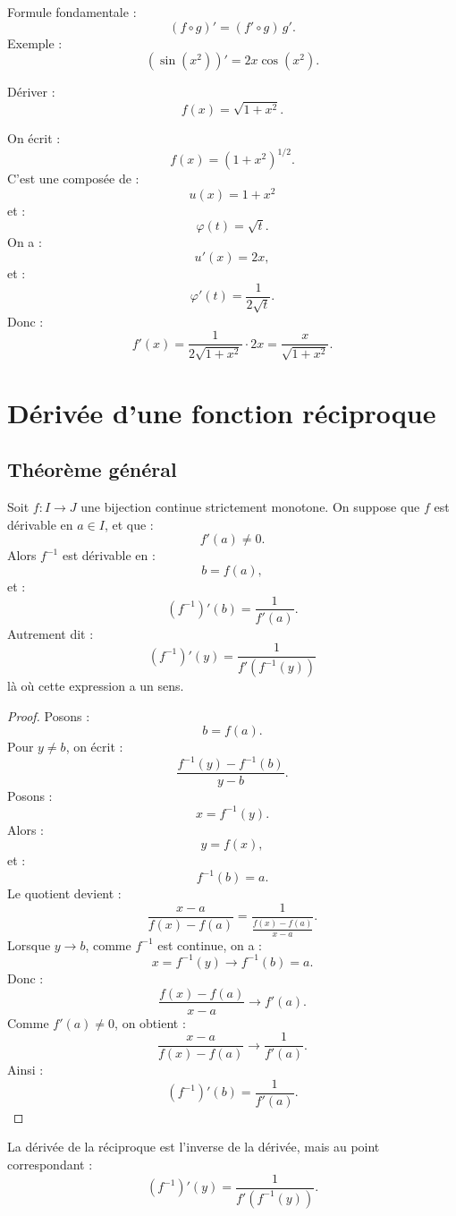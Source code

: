 \documentclass[11pt,a4paper]{article}
\begin{document}
\begin{retenirbox}
Formule fondamentale :
\[
(f\circ g)'=(f'\circ g)\,g'.
\]
Exemple :
\[
(\sin(x^2))'=2x\cos(x^2).
\]
\end{retenirbox}

\begin{exercicebox}[Composition]
Dériver :
\[
f(x)=\sqrt{1+x^2}.
\]
\end{exercicebox}

\begin{correctionbox}
On écrit :
\[
f(x)=(1+x^2)^{1/2}.
\]
C'est une composée de :
\[
u(x)=1+x^2
\]
et :
\[
\varphi(t)=\sqrt t.
\]
On a :
\[
u'(x)=2x,
\]
et :
\[
\varphi'(t)=\frac1{2\sqrt t}.
\]
Donc :
\[
f'(x)=\frac1{2\sqrt{1+x^2}}\cdot 2x
=
\frac{x}{\sqrt{1+x^2}}.
\]
\end{correctionbox}

\section{Dérivée d'une fonction réciproque}

\subsection{Théorème général}

\begin{theorembox}
Soit \(f:I\to J\) une bijection continue strictement monotone.  
On suppose que \(f\) est dérivable en \(a\in I\), et que :
\[
f'(a)\neq0.
\]
Alors \(f^{-1}\) est dérivable en :
\[
b=f(a),
\]
et :
\[
(f^{-1})'(b)=\frac1{f'(a)}.
\]
Autrement dit :
\[
(f^{-1})'(y)=\frac1{f'(f^{-1}(y))}
\]
là où cette expression a un sens.
\end{theorembox}

\begin{proof}
Posons :
\[
b=f(a).
\]
Pour \(y\neq b\), on écrit :
\[
\frac{f^{-1}(y)-f^{-1}(b)}{y-b}.
\]
Posons :
\[
x=f^{-1}(y).
\]
Alors :
\[
y=f(x),
\]
et :
\[
f^{-1}(b)=a.
\]
Le quotient devient :
\[
\frac{x-a}{f(x)-f(a)}
=
\frac1{\frac{f(x)-f(a)}{x-a}}.
\]
Lorsque \(y\to b\), comme \(f^{-1}\) est continue, on a :
\[
x=f^{-1}(y)\to f^{-1}(b)=a.
\]
Donc :
\[
\frac{f(x)-f(a)}{x-a}\to f'(a).
\]
Comme \(f'(a)\neq0\), on obtient :
\[
\frac{x-a}{f(x)-f(a)}\to\frac1{f'(a)}.
\]
Ainsi :
\[
(f^{-1})'(b)=\frac1{f'(a)}.
\]
\end{proof}

\begin{retenirbox}
La dérivée de la réciproque est l'inverse de la dérivée, mais au point correspondant :
\[
(f^{-1})'(y)=\frac1{f'(f^{-1}(y))}.
\]
\end{retenirbox}
\end{document}

